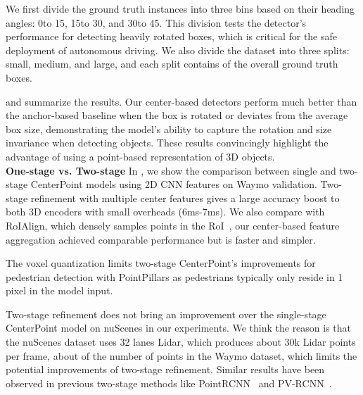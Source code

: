 \documentclass[final]{cvpr}
\begin{document}
We first divide the ground truth instances into three bins based on their heading angles: 0\textdegree to 15\textdegree, 15\textdegree to 30\textdegree, and 30\textdegree to 45\textdegree.
This division tests the detector's performance for detecting heavily rotated boxes, which is critical for the safe deployment of autonomous driving. 
We also divide the dataset into three splits: small, medium, and large, and each split contains  of the overall ground truth boxes.  

 and  summarize the results. 
Our center-based detectors perform much better than the anchor-based baseline when the box is rotated or deviates from the average box size, demonstrating the model's ability to capture the rotation and size invariance when detecting objects. 
These results convincingly highlight the advantage of using a point-based 
representation of 3D objects.\\

\noindent 
\textbf{One-stage vs. Two-stage}
In , we show the comparison between single and two-stage CenterPoint models using 2D CNN features on Waymo validation. 
Two-stage refinement with multiple center features gives a large accuracy boost to both 3D encoders with small overheads (6ms-7ms).
We also compare with RoIAlign, which densely samples  points in the RoI~\cite{PartA, pvrcnn}, our center-based feature aggregation achieved comparable performance but is faster and simpler. 

The voxel quantization limits two-stage CenterPoint's improvements for pedestrian detection with PointPillars as pedestrians typically only reside in 1 pixel in the model input. 

Two-stage refinement does not bring an improvement over the single-stage CenterPoint model on nuScenes in our experiments. 
We think the reason is that the nuScenes dataset uses 32 lanes Lidar, which produces about 30k Lidar points per frame, about  of the number of points in the Waymo dataset, which limits the potential improvements of two-stage refinement. 
Similar results have been observed in previous two-stage methods like PointRCNN~\cite{shi2019pointrcnn} and PV-RCNN~\cite{pvrcnn}.
\end{document}
